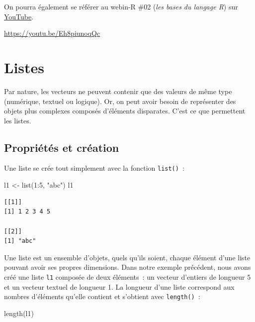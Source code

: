 \documentclass[
  letterpaper,
  DIV=11,
  numbers=noendperiod,
  oneside]{scrreprt}
\newenvironment{Shaded}{\begin{snugshade}}{\end{snugshade}}
\newcommand{\DecValTok}[1]{\textcolor[rgb]{0.68,0.00,0.00}{#1}}
\newcommand{\FunctionTok}[1]{\textcolor[rgb]{0.28,0.35,0.67}{#1}}
\newcommand{\NormalTok}[1]{\textcolor[rgb]{0.00,0.23,0.31}{#1}}
\newcommand{\OtherTok}[1]{\textcolor[rgb]{0.00,0.23,0.31}{#1}}
\newcommand{\SpecialCharTok}[1]{\textcolor[rgb]{0.37,0.37,0.37}{#1}}
\newcommand{\StringTok}[1]{\textcolor[rgb]{0.13,0.47,0.30}{#1}}
\begin{document}
On pourra également se référer au webin-R \#02 (\emph{les bases du
langage R}) sur \href{https://youtu.be/Eh8piunoqQc}{YouTube}.

\url{https://youtu.be/Eh8piunoqQc}

\hypertarget{sec-listes}{%
\chapter{Listes}\label{sec-listes}}

Par nature, les vecteurs ne peuvent contenir que des valeurs de même
type (numérique, textuel ou logique). Or, on peut avoir besoin de
représenter des objets plus complexes composés d'éléments disparates.
C'est ce que permettent les listes.

\hypertarget{propriuxe9tuxe9s-et-cruxe9ation}{%
\section{Propriétés et création}\label{propriuxe9tuxe9s-et-cruxe9ation}}

Une liste se crée tout simplement avec la fonction \texttt{list()}~:

\begin{Shaded}
\begin{Highlighting}[]
\NormalTok{l1 }\OtherTok{\textless{}{-}} \FunctionTok{list}\NormalTok{(}\DecValTok{1}\SpecialCharTok{:}\DecValTok{5}\NormalTok{, }\StringTok{"abc"}\NormalTok{)}
\NormalTok{l1}
\end{Highlighting}
\end{Shaded}

\begin{verbatim}
[[1]]
[1] 1 2 3 4 5

[[2]]
[1] "abc"
\end{verbatim}

Une liste est un ensemble d'objets, quels qu'ils soient, chaque élément
d'une liste pouvant avoir ses propres dimensions. Dans notre exemple
précédent, nous avons créé une liste \texttt{l1} composée de deux
éléments~: un vecteur d'entiers de longueur 5 et un vecteur textuel de
longueur 1. La longueur d'une liste correspond aux nombres d'éléments
qu'elle contient et s'obtient avec \texttt{length()}~:

\begin{Shaded}
\begin{Highlighting}[]
\FunctionTok{length}\NormalTok{(l1)}
\end{Highlighting}
\end{Shaded}
\end{document}
